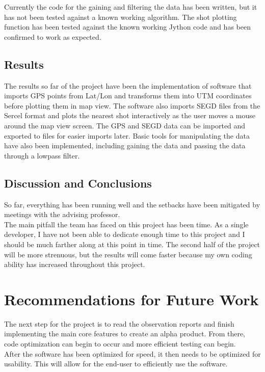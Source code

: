 \documentclass[11pt]{article}
\begin{document}
Currently the code for the gaining and filtering the data has been written, but it has not been tested against a known working algorithm. The shot plotting function has been tested against the known working Jython code and has been confirmed to work as expected.

\subsection{Results}

The results so far of the project have been the implementation of software that imports GPS points from Lat/Lon and transforms them into UTM coordinates before plotting them in map view. The software also imports SEGD files from the Sercel format and plots the nearest shot interactively as the user moves a mouse around the map view screen. The GPS and SEGD data can be imported and exported to files for easier imports later. Basic tools for manipulating the data have also been implemented, including gaining the data and passing the data through a lowpass filter.

\subsection{Discussion and Conclusions}

So far, everything has been running well and the setbacks have been mitigated by meetings with the advising professor.  \\

The main pitfall the team has faced on this project has been time. As a single developer, I have not been able to dedicate enough time to this project and I should be much farther along at this point in time. The second half of the project will be more strenuous, but the results will come faster because my own coding ability has increased throughout this project. 

\section{Recommendations for Future Work}

The next step for the project is to read the observation reports and finish implementing the main core features to create an alpha product. From there, code optimization can begin to occur and more efficient testing can begin. \\

After the software has been optimized for speed, it then needs to be optimized for usability. This will allow for the end-user to efficiently use the software.
\end{document}
